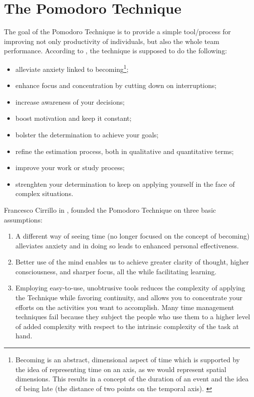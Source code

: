 \documentclass[11pt,singleside]{myfithesis2}
\begin{document}
	\section{The Pomodoro Technique}

The goal of the Pomodoro Technique is to provide a simple tool/process for improving not only productivity of individuals, but also the whole team performance. According to \cite{pomodoro}, the technique is supposed to do the following:
\begin{itemize}
	\item alleviate anxiety linked to becoming\footnote{Becoming is an abstract, dimensional aspect of time which is supported by the idea of representing time on an axis,  as we would represent spatial dimensions. This results in a concept of the duration of an event and the idea of being late (the distance of two points on the temporal axis). \cite{pomodoro}};
	\item enhance focus and concentration by cutting down on interruptions;
	\item increase awareness of your decisions;
	\item boost motivation and keep it constant;
	\item bolster the determination to achieve your goals;
	\item refine the estimation process, both in qualitative and quantitative terms;
	\item improve your work or study process;
	\item strenghten your determination to keep on applying yourself in the face of complex situations.
\end{itemize}

Francesco Cirrillo in \cite{pomodoro}, founded the Pomodoro Technique on three basic assumptions:
\begin{enumerate}
	\item A different way of seeing time (no longer focused on the concept of becoming) alleviates anxiety and in doing so leads to enhanced personal effectiveness. 
	\item Better use of the mind enables us to achieve greater clarity of thought, higher consciousness, and sharper focus, all the while facilitating learning. 
	\item Employing easy-to-use, unobtrusive tools reduces the complexity of applying the Technique while favoring continuity, and allows you to concentrate your efforts on the 	activities you want to accomplish. Many time management techniques fail because they subject the people who use them to a higher level of added complexity with respect to the intrinsic complexity of the task at hand.
\end{enumerate}
\end{document}
